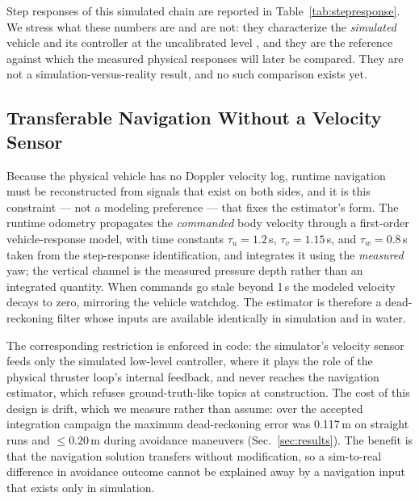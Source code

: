 

Step responses of this simulated chain are reported in
Table~\ref{tab:stepresponse}. We stress what these numbers are and are not:
they characterize the \emph{simulated} vehicle and its controller at the
uncalibrated level \SZERO{}, and they are the reference against which the
measured physical responses will later be compared. They are not a
simulation-versus-reality result, and no such comparison exists yet.



\subsection{Transferable Navigation Without a Velocity Sensor}
\label{sec:navigation}

Because the physical vehicle has no Doppler velocity log, runtime navigation
must be reconstructed from signals that exist on both sides, and it is this
constraint --- not a modeling preference --- that fixes the estimator's form.
The runtime odometry propagates the \emph{commanded} body velocity through a
first-order vehicle-response model, with time constants $\tau_u = 1.2$\,s,
$\tau_v = 1.15$\,s, and $\tau_w = 0.8$\,s taken from the step-response
identification, and integrates it using the \emph{measured} yaw; the vertical
channel is the measured pressure depth rather than an integrated quantity.
When commands go stale beyond 1\,s the modeled velocity decays to zero,
mirroring the vehicle watchdog. The estimator is therefore a dead-reckoning
filter whose inputs are available identically in simulation and in water.

The corresponding restriction is enforced in code: the simulator's velocity
sensor feeds only the simulated low-level controller, where it plays the role
of the physical thruster loop's internal feedback, and never reaches the
navigation estimator, which refuses ground-truth-like topics at
construction. The cost of this design is drift, which we measure rather than
assume: over the accepted integration campaign the maximum dead-reckoning
error was 0.117\,m on straight runs and $\leq 0.20$\,m during avoidance
maneuvers (Sec.~\ref{sec:results}). The benefit is that the navigation
solution transfers without modification, so a sim-to-real difference in
avoidance outcome cannot be explained away by a navigation input that exists
only in simulation.
